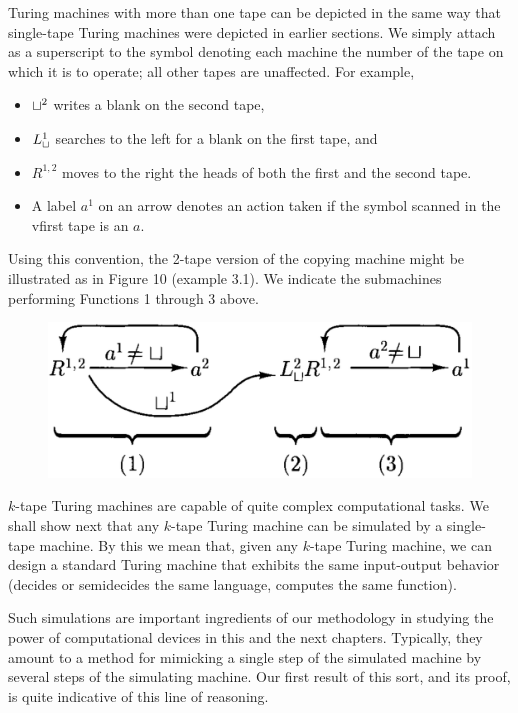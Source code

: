Turing machines with more than one tape can be depicted in the same way that single-tape Turing machines were depicted in earlier sections. We simply attach as a superscript to the symbol denoting each machine the number of the tape on which it is to operate; all other tapes are unaffected. For example,
\begin{itemize}
  \item $\sqcup^2$ writes a blank on the second tape, 
  \item $L_{\sqcup}^1$ searches to the left for a blank on the first tape, and
  \item $R^{1, 2}$ moves to the right the heads of both the first and the second tape.
  \item A label $a^1$ on an arrow denotes an action taken if the symbol scanned in the vfirst tape is an $a$.  
\end{itemize}
Using this convention, the 2-tape version of the copying machine might be illustrated as in Figure 10 (example 3.1). We indicate the submachines performing Functions 1 through 3 above.
\begin{figure}[H]
  \centering
  \includegraphics[width=\linewidth]{img/fig-4.15.png}
  \caption{}
  \label{fig:4.10}
\end{figure}

$k$-tape Turing machines are capable of quite complex computational tasks. We shall show next that any $k$-tape Turing machine can be simulated by a single-tape machine. By this we mean that, given any $k$-tape Turing machine, we can design a standard Turing machine that exhibits the same input-output behavior (decides or semidecides the same language, computes the same function).

\vspace*{\fill}
\columnbreak

Such simulations are important ingredients of our methodology in studying the power of computational devices in this and the next chapters. Typically, they amount to a method for mimicking a single step of the simulated machine by several steps of the simulating machine. Our first result of this sort, and its proof, is quite indicative of this line of reasoning.

